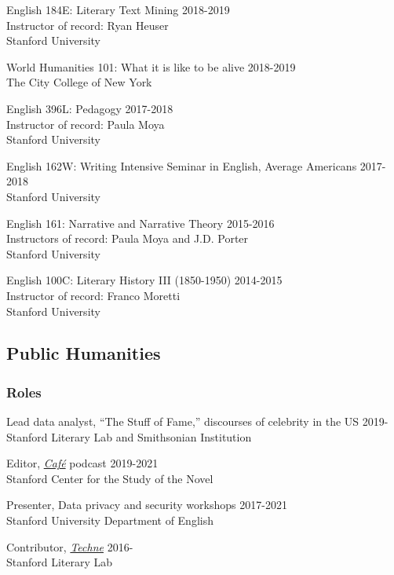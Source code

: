 \documentclass[
  12pt,
  letterpaper,
]{article}
\begin{document}
English 184E: Literary Text Mining \hfill 2018-2019\\
Instructor of record: Ryan Heuser\\
Stanford University

World Humanities 101: What it is like to be alive \hfill 2018-2019\\
The City College of New York

English 396L: Pedagogy \hfill 2017-2018\\
Instructor of record: Paula Moya\\
Stanford University

English 162W: Writing Intensive Seminar in English, Average Americans
\hfill 2017-2018\\
Stanford University

English 161: Narrative and Narrative Theory \hfill 2015-2016\\
Instructors of record: Paula Moya and J.D. Porter\\
Stanford University

English 100C: Literary History III (1850-1950) \hfill 2014-2015\\
Instructor of record: Franco Moretti\\
Stanford University

\hypertarget{public-humanities}{%
\subsection{Public Humanities}\label{public-humanities}}

\hypertarget{roles}{%
\subsubsection{Roles}\label{roles}}

Lead data analyst, ``The Stuff of Fame,'' discourses of celebrity in the
US \hfill 2019-\\
Stanford Literary Lab and Smithsonian Institution

Editor, \href{https://novel.stanford.edu/csn-cafe}{\emph{Café}} podcast
\hfill 2019-2021\\
Stanford Center for the Study of the Novel

Presenter, Data privacy and security workshops \hfill 2017-2021\\
Stanford University Department of English

Contributor, \href{https://litlab.stanford.edu/techne/}{\emph{Techne}}
\hfill 2016-\\
Stanford Literary Lab
\end{document}
